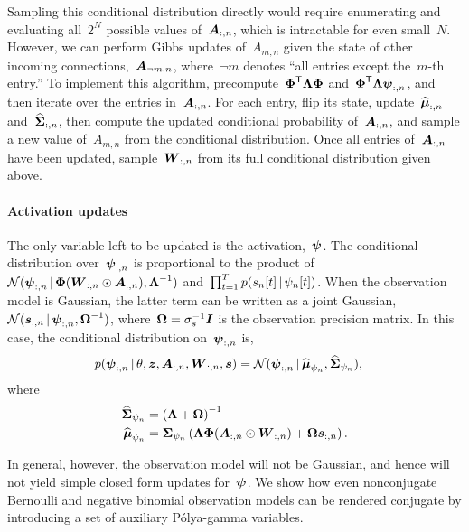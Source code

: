 Sampling this conditional distribution directly would require enumerating and evaluating all~$2^N$ possible values of~$\boldsymbol{A}_{:,n}$, which is intractable for even small~$N$. However, we can perform Gibbs updates of~$A_{m,n}$ given the state of other incoming connections,~$\boldsymbol{A}_{\neg m,n}$, where~$\neg m$ denotes ``all entries except the~$m$-th entry.'' To implement this algorithm, precompute~$\boldsymbol{\Phi}^{\mathsf{T}} \boldsymbol{\Lambda} \boldsymbol{\Phi}$ and~$\boldsymbol{\Phi}^{\mathsf{T}} \boldsymbol{\Lambda} \boldsymbol{\psi}_{:,n}$, and then iterate over the entries in~$\boldsymbol{A}_{:,n}$. For each entry, flip its state, update~$\widehat{\boldsymbol{\mu}}_{:,n}$ and~$\widehat{\boldsymbol{\Sigma}}_{:,n}$, then compute the updated conditional probability of~$\boldsymbol{A}_{:,n}$, and sample a new value of~$A_{m,n}$ from the conditional distribution. Once all entries of~$\boldsymbol{A}_{:,n}$ have been updated, sample~$\boldsymbol{W}_{:,n}$ from its full conditional distribution given above.

\paragraph{Activation updates}
The only variable left to be updated is the activation,~$\boldsymbol{\psi}$. The conditional distribution over~$\boldsymbol{\psi}_{:,n}$ is proportional to the product of~$\mathcal{N}(\boldsymbol{\psi}_{:,n} \,|\, \boldsymbol{\Phi} (\boldsymbol{W}_{:,n} \odot \boldsymbol{A}_{:,n}), \boldsymbol{\Lambda}^{-1})$ and~$\prod_{t=1}^T p(s_{n}[t] \,|\, \psi_{n}[t])$. When the observation model is Gaussian, the latter term can be written as a joint Gaussian,~$\mathcal{N}(\boldsymbol{s}_{:,n} \,|\, \boldsymbol{\psi}_{:,n}, \boldsymbol{\Omega}^{-1})$, where~$\boldsymbol{\Omega} = \sigma_s^{-1} \boldsymbol{I}$ is the observation precision matrix. In this case, the conditional distribution on~$\boldsymbol{\psi}_{:,n}$ is,
\begin{align}
p(\boldsymbol{\psi}_{:,n} \,|\, \theta, \boldsymbol{z}, \boldsymbol{A}_{:,n}, \boldsymbol{W}_{:,n}, \boldsymbol{s}) &= 
\mathcal{N}(\boldsymbol{\psi}_{:,n} \,|\, \widehat{\boldsymbol{\mu}}_{\psi_n}, \widehat{\boldsymbol{\Sigma}}_{\psi_n}),
\end{align}
where
\begin{align}
\widehat{\boldsymbol{\Sigma}}_{\psi_n} &= \left( \boldsymbol{\Lambda} + \boldsymbol{\Omega} \right)^{-1}
\\
\widehat{\boldsymbol{\mu}}_{\psi_n} &= \boldsymbol{\Sigma}_{\psi_{n}} \left(\boldsymbol{\Lambda} \boldsymbol{\Phi} (\boldsymbol{A}_{:,n} \odot \boldsymbol{W}_{:,n}) + \boldsymbol{\Omega} \boldsymbol{s}_{:,n} \right).
\end{align}


In general, however, the observation model will not be Gaussian, and hence will not yield simple closed form updates for~$\boldsymbol{\psi}$. We show how even nonconjugate Bernoulli and negative binomial observation models can be rendered conjugate by introducing a set of auxiliary P\'{o}lya-gamma variables.

